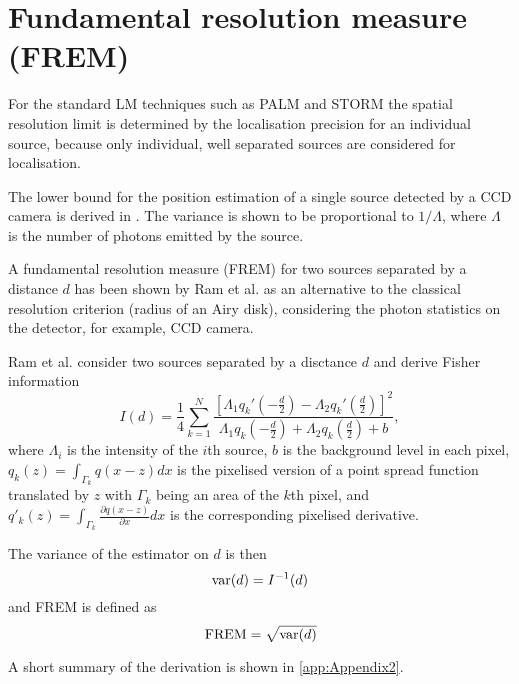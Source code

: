 
\section{Fundamental resolution measure (FREM)}

For the standard LM techniques such as PALM and STORM  the spatial resolution limit is determined by the localisation precision for an individual source, because only individual, well separated sources are considered for localisation. 

The \CR lower bound for the position estimation of a single source detected by a CCD camera is derived in \cite{Ram2006,Ram2006b}. The variance is shown to be proportional to $1/\Lambda$, where $\Lambda$ is the number of photons emitted by the source. 

A fundamental resolution measure (FREM) for two sources separated by a distance $d$ has been shown by Ram et al. \cite{Ram2006} as an alternative to the classical resolution criterion (radius of an Airy disk), considering the photon statistics on the detector, for example,  CCD camera.

Ram et al. \cite{Ram2006} consider two sources separated by a disctance $d$ and derive Fisher information
%
\begin{equation}
	I(d)=\frac{1}{4}\sum_{k=1}^N\frac{\left[\Lambda_1q_k'(-\frac{d}{2})-\Lambda_2q_k'(\frac{d}{2})\right]^2}{\Lambda_1q_k(-\frac{d}{2})+\Lambda_2q_k(\frac{d}{2})+b},
	\label{eq:Ram FREM}
\end{equation}
%
where $\Lambda_i$ is the intensity of the $i$th source, $b$ is the background level in each pixel, $q_k(z)=\int_{\Gamma_k}q(x-z)dx$ is the pixelised version of a point spread function translated by $z$ with $\Gamma_k$ being an area of the $k$th pixel, and $q'_k(z)=\int_{\Gamma_k}\frac{\partial q(x-z)}{\partial x}dx$ is the corresponding pixelised derivative. 

The variance of the estimator on $d$ is then 
%
\begin{equation}
	\mathrm{var}(d)=I^{-1}(d)
\end{equation}
%
and FREM is defined as 
%
\begin{equation}
	\, \mathrm{FREM}=\sqrt{\mathrm{var}(d)}
	\label{eq:FREM}	
\end{equation}

A short summary of the derivation is shown in \autoref{app:Appendix2}. 

